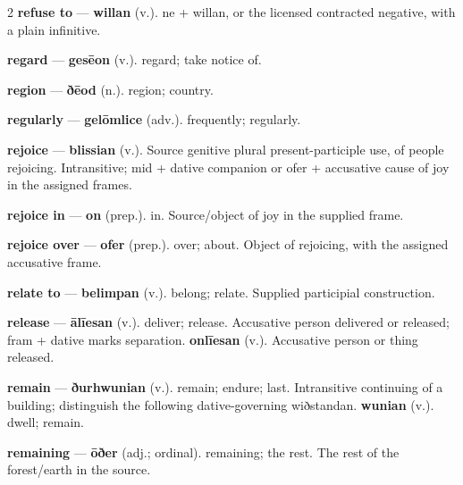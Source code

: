 \begin{multicols}{2}
\textbf{refuse to} — \textbf{willan} (v.). ne + willan, or the licensed contracted negative, with a plain infinitive.\par
\textbf{regard} — \textbf{gesēon} (v.). regard; take notice of.\par
\textbf{region} — \textbf{ðēod} (n.). region; country.\par
\textbf{regularly} — \textbf{gelōmlice} (adv.). frequently; regularly.\par
\textbf{rejoice} — \textbf{blissian} (v.). Source genitive plural present-participle use, of people rejoicing. Intransitive; mid + dative companion or ofer + accusative cause of joy in the assigned frames.\par
\textbf{rejoice in} — \textbf{on} (prep.). in. Source/object of joy in the supplied frame.\par
\textbf{rejoice over} — \textbf{ofer} (prep.). over; about. Object of rejoicing, with the assigned accusative frame.\par
\textbf{relate to} — \textbf{belimpan} (v.). belong; relate. Supplied participial construction.\par
\textbf{release} — \textbf{ālīesan} (v.). deliver; release. Accusative person delivered or released; fram + dative marks separation. \textbf{onlīesan} (v.). Accusative person or thing released.\par
\textbf{remain} — \textbf{ðurhwunian} (v.). remain; endure; last. Intransitive continuing of a building; distinguish the following dative-governing wiðstandan. \textbf{wunian} (v.). dwell; remain.\par
\textbf{remaining} — \textbf{ōðer} (adj.; ordinal). remaining; the rest. The rest of the forest/earth in the source.\par

\end{multicols}
